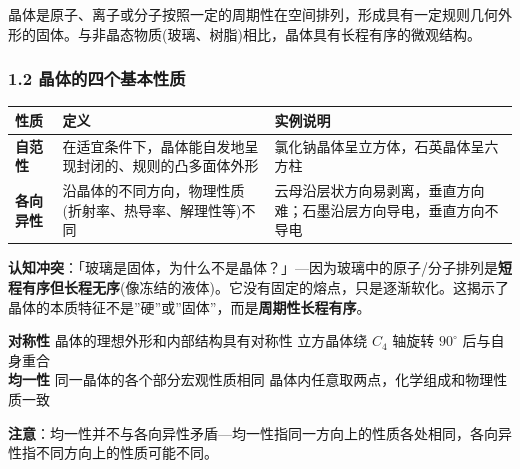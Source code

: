 \documentclass[a4paper,11pt]{ctexart}
\newcounter{none}
\newcommand{\箭}{\ensuremath{\rightarrow}}
\newcommand{\左箭}{\ensuremath{\leftarrow}}
\newcommand{\上箭}{\ensuremath{\uparrow}}
\newcommand{\下箭}{\ensuremath{\downarrow}}
\newcommand{\衡}{\ensuremath{\rightleftharpoons}}
\newcommand{\双箭}{\ensuremath{\leftrightarrow}}
\newcommand{\约等于}{\ensuremath{\approx}}
\newcommand{\小于等于}{\ensuremath{\leq}}
\newcommand{\大于等于}{\ensuremath{\geq}}
\newcommand{\不等于}{\ensuremath{\neq}}
\newcommand{\西格马}{\ensuremath{\sigma}}
\newcommand{\派}{\ensuremath{\pi}}
\begin{document}
晶体是原子、离子或分子按照一定的周期性在空间排列，形成具有一定规则几何外形的固体。与非晶态物质(玻璃、树脂)相比，晶体具有长程有序的微观结构。

\subsubsection{1.2 晶体的四个基本性质}\label{ux6676ux4f53ux7684ux56dbux4e2aux57faux672cux6027ux8d28}

{\def\LTcaptype{none} %
\begin{longtable}[]{@{}
  >{\raggedright\arraybackslash}p{}
  >{\raggedright\arraybackslash}p{}
  >{\raggedright\arraybackslash}p{}@{}}
\toprule\noalign{}
\begin{minipage}[b]{\linewidth}\raggedright
性质
\end{minipage} & \begin{minipage}[b]{\linewidth}\raggedright
定义
\end{minipage} & \begin{minipage}[b]{\linewidth}\raggedright
实例说明
\end{minipage} \\
\midrule\noalign{}
\endhead
\bottomrule\noalign{}
\endlastfoot
\textbf{自范性} & 在适宜条件下，晶体能自发地呈现封闭的、规则的凸多面体外形 & 氯化钠晶体呈立方体，石英晶体呈六方柱 \\
\textbf{各向异性} & 沿晶体的不同方向，物理性质(折射率、热导率、解理性等)不同 & 云母沿层状方向易剥离，垂直方向难；石墨沿层方向导电，垂直方向不导电 \\
\end{longtable}
}

\textbf{认知冲突}：「玻璃是固体，为什么不是晶体？」---因为玻璃中的原子/分子排列是\textbf{短程有序但长程无序}(像冻结的液体)。它没有固定的熔点，只是逐渐软化。这揭示了晶体的本质特征不是''硬''或''固体''，而是\textbf{周期性长程有序}。

\textbf{对称性} \textbar{} 晶体的理想外形和内部结构具有对称性 \textbar{} 立方晶体绕 \(C_4\) 轴旋转 \(90^\circ\) 后与自身重合 \textbar{}\\
\textbf{均一性} \textbar{} 同一晶体的各个部分宏观性质相同 \textbar{} 晶体内任意取两点，化学组成和物理性质一致 \textbar{}

\textbf{注意}：均一性并不与各向异性矛盾---均一性指同一方向上的性质各处相同，各向异性指不同方向上的性质可能不同。
\end{document}
